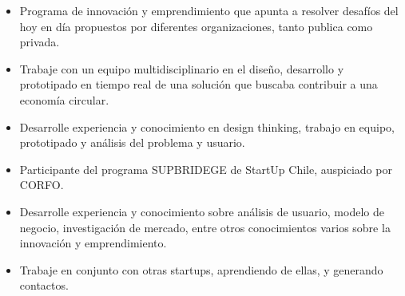 \documentclass[10pt,a4paper,ragged2e]{altacv}
\begin{document}

\begin{fullwidth}
\makecvheader
\end{fullwidth}



\begin{itemize}
\item Programa de innovación y emprendimiento que apunta a resolver desafíos del hoy en día propuestos por diferentes organizaciones, tanto publica como privada.
\smallskip
\item Trabaje con un equipo multidisciplinario en el diseño, desarrollo y prototipado en tiempo real de una solución que buscaba contribuir a una economía circular.
\smallskip
\item Desarrolle experiencia y conocimiento en design thinking, trabajo en equipo, prototipado y análisis del problema y usuario.
\end{itemize}

\divider

\begin{itemize}
\item Participante del programa SUPBRIDEGE de StartUp Chile, auspiciado por CORFO.
\smallskip
\item Desarrolle experiencia y conocimiento sobre análisis de usuario, modelo de negocio, investigación de mercado, entre otros conocimientos varios sobre la innovación y emprendimiento.
\item Trabaje en conjunto con otras startups, aprendiendo de ellas, y generando contactos.
\end{itemize}
\end{document}
